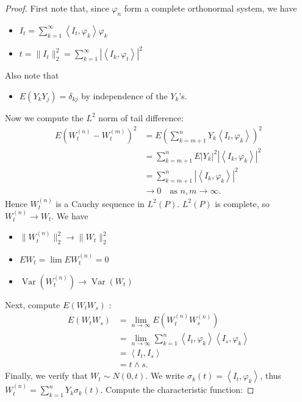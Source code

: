 \begin{proof}
	First note that, since $\varphi_n$ form a complete orthonormal system, we have
	\begin{itemize}
		\item $I_t = \sum_{k=1}^{\infty} \left\langle I_t, \varphi_k \right\rangle \varphi_k$
		\item $t = \|I_t\|_2^2 = \sum_{k=1}^{\infty} \left| \left\langle I_k, \varphi_t \right\rangle  \right| ^2$
	\end{itemize}
	Also note that
	\begin{itemize}
		\item  $E(Y_k Y_j) = \delta_{kj}$ by independence of the $Y_k$'s.
	\end{itemize}
	Now we compute the $L^2$ norm of tail difference:
	\begin{align*}
		E\left( W_t^{(n)} - W_t^{(m)} \right) ^2
		&= E\left( \sum_{k=m+1}^{n} Y_k \left\langle I_t, \varphi_k \right\rangle  \right) ^2 \\
		&= \sum_{k=m+1}^{n} E|Y_k|^2 \left| \left\langle I_k, \varphi_k \right\rangle  \right| ^2 \\
		&= \sum_{k=m+1}^{n} \left| \left\langle I_k, \varphi_k \right\rangle  \right| ^2 \\
		& \to 0 \quad \text{as } n, m \to \infty
	.\end{align*}
	Hence $W_t^{(n)}$ is a Cauchy sequence in $L^2(P)$. $L^2(P)$ is complete, so $W_t^{(n)} \to  W_t$. We have
	\begin{itemize}
		\item $\|W_t^{(n)}\|_2^2 \to  \|W_t\|_2^2$
		\item $E W_t = \lim E W_t^{(n)} = 0$ 
		\item $\operatorname{Var} (W_t^{(n)}) \to \operatorname{Var} (W_t)$
	\end{itemize}
	Next, compute $E(W_t W_s)$ :
	\begin{align*}
		E\left( W_t W_s\right) 
		&= \lim_{n \to \infty} E\left( W_t^{(n)}W_s^{(n)} \right)  \\
		&= \lim_{n \to \infty} \sum_{k=1}^{n} \left\langle I_t, \varphi_k \right\rangle \left\langle I_s, \varphi_k \right\rangle  \\
		&= \left\langle I_t, I_s \right\rangle  \\
		&= t \wedge s 
	.\end{align*}
	Finally, we verify that $W_t \sim N(0,t)$.
	We write $\sigma_k(t) = \left\langle I_t, \varphi_k \right\rangle $, thus $W_t^{(n)} = \sum_{k=1}^{n} Y_k \sigma_k(t)$. Compute the characteristic function:

\end{proof}
